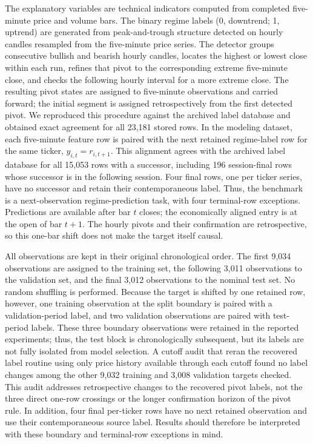 The explanatory variables are technical indicators computed from completed five-minute price and volume bars. The binary regime labels (0, downtrend; 1, uptrend) are generated from peak-and-trough structure detected on hourly candles resampled from the five-minute price series. The detector groups consecutive bullish and bearish hourly candles, locates the highest or lowest close within each run, refines that pivot to the corresponding extreme five-minute close, and checks the following hourly interval for a more extreme close. The resulting pivot states are assigned to five-minute observations and carried forward; the initial segment is assigned retrospectively from the first detected pivot. We reproduced this procedure against the archived label database and obtained exact agreement for all 23,181 stored rows. In the modeling dataset, each five-minute feature row is paired with the next retained regime-label row for the same ticker, $y_{i,t} = r_{i,t+1}$. This alignment agrees with the archived label database for all 15,053 rows with a successor, including 196 session-final rows whose successor is in the following session. Four final rows, one per ticker series, have no successor and retain their contemporaneous label. Thus, the benchmark is a next-observation regime-prediction task, with four terminal-row exceptions. Predictions are available after bar $t$ closes; the economically aligned entry is at the open of bar $t+1$. The hourly pivots and their confirmation are retrospective, so this one-bar shift does not make the target itself causal.

All observations are kept in their original chronological order. The first 9,034 observations are assigned to the training set, the following 3,011 observations to the validation set, and the final 3,012 observations to the nominal test set. No random shuffling is performed. Because the target is shifted by one retained row, however, one training observation at the split boundary is paired with a validation-period label, and two validation observations are paired with test-period labels. These three boundary observations were retained in the reported experiments; thus, the test block is chronologically subsequent, but its labels are not fully isolated from model selection. A cutoff audit that reran the recovered label routine using only price history available through each cutoff found no label changes among the other 9,032 training and 3,008 validation targets checked. This audit addresses retrospective changes to the recovered pivot labels, not the three direct one-row crossings or the longer confirmation horizon of the pivot rule. In addition, four final per-ticker rows have no next retained observation and use their contemporaneous source label. Results should therefore be interpreted with these boundary and terminal-row exceptions in mind.

